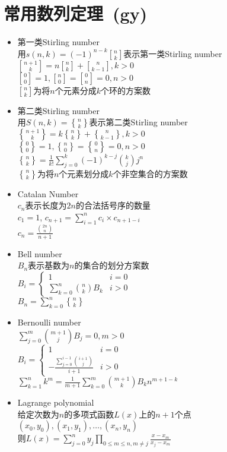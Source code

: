 \section{常用数列定理\ \small(gy)}
\begin{itemize}
	\item 第一类Stirling number\\
	用$ s(n, k) = (-1) ^ {n - k} {n \brack k} $表示第一类Stirling number\\
	$ {n + 1 \brack k} = n {n \brack k} + {n \brack k - 1}, k > 0 $\\
	$ {0 \brack 0} = 1, {n \brack 0} = {0 \brack n} = 0, n > 0 $\\
	$ {n \brack k} $为将$ n $个元素分成$ k $个环的方案数
	\item 第二类Stirling number\\
	用$ S(n, k) = {n \brace k} $表示第二类Stirling number\\
	$ {n + 1 \brace k} = k {n \brace k} + {n \brace k - 1}, k > 0 $\\
	$ {0 \brace 0} = 1, {n \brace 0} = {0 \brace n} = 0, n > 0 $\\
	$ {n \brace k} = \frac{1}{k!} \sum\limits_{j = 0}^{k} (-1) ^ {k - j} \binom{k}{j} j ^ n $\\
	$ {n \brace k} $为将$ n $个元素划分成$ k $个非空集合的方案数
	\item Catalan Number\\$ c_n $表示长度为$ 2n $的合法括号序的数量\\$ c_1 = 1 $, $ c_{n+1} = \sum\limits_{i=1}^{n} c_i \times c_{n + 1 - i} $\\$ c_n = \frac{\binom{2n}{n}}{n + 1} $
	\item Bell number\\
	$ B_n $表示基数为$ n $的集合的划分方案数\\
	$ B_i = \begin{cases}
	1 & i = 0\\
	\sum\limits_{k = 0}^{n} \binom{n}{k} B_k & i > 0
	\end{cases} $\\
	$ B_n = \sum\limits_{k = 0}^{n} {n \brace k} $\\
	\item Bernoulli number\\
	$ \sum\limits_{j = 0}^{m} \binom{m + 1}{j} B_j = 0, m > 0 $\\
	$ B_i = \begin{cases}
	1 & i = 0\\
	-\frac{\sum\limits_{j = 0}^{i - 1} \binom{i + 1}{j}}{i + 1} & i > 0
	\end{cases} $\\
	$ \sum\limits_{k = 1}^{n} k ^ m = \frac{1}{m + 1} \sum\limits_{k = 0}^{m} \binom{m + 1}{k} B_k n ^ {m + 1 - k} $
	\item Lagrange polynomial\\
	给定次数为$ n $的多项式函数$ L(x) $上的$ n + 1 $个点$ (x_0, y_0), (x_1, y_1), \dots, (x_n, y_n) $\\
	则$ L(x) = \sum\limits_{j = 0}^{n} y_j \prod\limits_{0 \leq m \leq n, m \ne j} \frac{x - x_m}{x_j - x_m} $
\end{itemize}